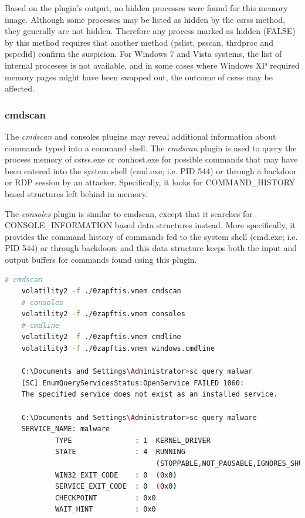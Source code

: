Based on the plugin's output, no hidden processes were found for this memory image. Although some processes may be listed as hidden by the csrss method, they generally are not hidden. Therefore any process marked as hidden (FALSE) by this method requires that another method (pslist, psscan, thrdproc and pspcdid) confirm the suspicion. For Windows 7 and Vista systems, the list of internal processes is not available, and in some cases where Windows XP required memory pages might have been swapped out, the outcome of csrss may be affected.


\subsubsection{cmdscan}
The \textit{cmdscan} and consoles plugins may reveal additional information about commands typed into a command shell. The \textit{cmdscan} plugin is used to query the process memory of csrss.exe or conhost.exe for possible commands that may have been entered into the system shell (cmd.exe; i.e. PID 544) or through a backdoor or RDP session by an attacker. Specifically, it looks for COMMAND\_HISTORY based structures left behind in memory.

The \textit{consoles} plugin is similar to cmdscan, except that it searches for CONSOLE\_INFORMATION based data structures instead. More specifically, it provides the command history of commands fed to the system shell (cmd.exe; i.e. PID 544) or through backdoors and this data structure keeps both the input and output buffers for commands found using this plugin.

\begin{lstlisting}[language=bash]
    # cmdscan
    volatility2 -f ./0zapftis.vmem cmdscan
    # consoles
    volatility2 -f ./0zapftis.vmem consoles
    # cmdline
    volatility2 -f ./0zapftis.vmem cmdline
    volatility3 -f ./0zapftis.vmem windows.cmdline

    C:\Documents and Settings\Administrator>sc query malwar
    [SC] EnumQueryServicesStatus:OpenService FAILED 1060:
    The specified service does not exist as an installed service.

    C:\Documents and Settings\Administrator>sc query malware
    SERVICE_NAME: malware
            TYPE               : 1  KERNEL_DRIVER
            STATE              : 4  RUNNING
                                    (STOPPABLE,NOT_PAUSABLE,IGNORES_SHUTDOWN)
            WIN32_EXIT_CODE    : 0  (0x0)
            SERVICE_EXIT_CODE  : 0  (0x0)
            CHECKPOINT         : 0x0
            WAIT_HINT          : 0x0
\end{lstlisting}

